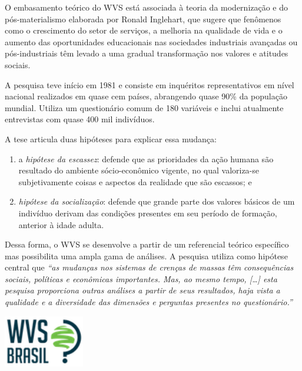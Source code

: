 \documentclass[
  10pt,
  brazil,
  a4paper,
  twoside, notitlepage, openright]{book}
\providecommand{\tightlist}{%
  \setlength{\itemsep}{0pt}\setlength{\parskip}{0pt}}
\begin{document}
O embasamento teórico do WVS está associada à teoria da modernização e do pós-materialismo elaborada por Ronald Inglehart, que sugere que fenômenos como o crescimento do setor de serviços, a melhoria na qualidade de vida e o aumento das oportunidades educacionais nas sociedades industriais avançadas ou pós-industriais têm levado a uma gradual transformação nos valores e atitudes sociais.

A pesquisa teve início em 1981 e consiste em inquéritos representativos em nível nacional realizados em quase cem países, abrangendo quase 90\% da população mundial. Utiliza um questionário comum de 180 variáveis e inclui atualmente entrevistas com quase 400 mil indivíduos.

A tese articula duas hipóteses para explicar essa mudança:

\begin{enumerate}
\def\labelenumi{\alph{enumi})}
\tightlist
\item
  a \emph{hipótese da escassez}: defende que as prioridades da ação humana são resultado do ambiente sócio-econômico vigente, no qual valoriza-se subjetivamente coisas e aspectos da realidade que são escassos; e\\
\item
  \emph{hipótese da socialização}: defende que grande parte dos valores básicos de um indivíduo derivam das condições presentes em seu período de formação, anterior à idade adulta.
\end{enumerate}

Dessa forma, o WVS se desenvolve a partir de um referencial teórico específico mas possibilita uma ampla gama de análises. A pesquisa utiliza como hipótese central que \emph{``as mudanças nos sistemas de crenças de massas têm consequências sociais, políticas e econômicas importantes\emph{. Mas, ao mesmo tempo, }{[}\ldots{]} esta pesquisa proporciona outras análises a partir de seus resultados, haja vista a qualidade e a diversidade das dimensões e perguntas presentes no questionário.''} \citep{castro_conteudo_2015}

\begin{center}\includegraphics[width=1.39in]{img/wvs_logo} \end{center}
\end{document}

